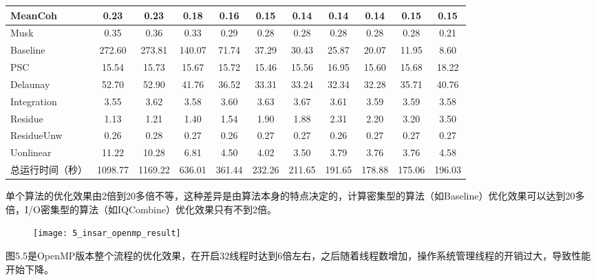 \begin{table}[!htbp]
\begin{tabular}{|l|c|c|c|c|c|c|c|c|c|c|}
		MeanCoh	            &   0.23	&   0.23	&   0.18	&   0.16	&   0.15	&   0.14	&   0.14	&   0.14	&   0.15	&   0.15      \\ \hline
		Musk	            &   0.35	&   0.36	&   0.33	&   0.29	&   0.28	&   0.28	&   0.28	&   0.28	&   0.28	&   0.21      \\ \hline
		Baseline	        &   272.60	&   273.81	&   140.07	&   71.74	&   37.29	&   30.43	&   25.87	&   20.07	&   11.95	&   8.60      \\ \hline
		PSC	                &   15.54	&   15.73	&   15.67	&   15.72	&   15.46	&   15.56	&   16.95	&   15.60	&   15.68	&   18.22      \\ \hline
		Delaunay	        &   52.70	&   52.90	&   41.76	&   36.52	&   33.31	&   33.24	&   32.34	&   32.28	&   35.71	&   40.76      \\ \hline
		Integration	        &   3.55	&   3.62	&   3.58	&   3.60	&   3.63	&   3.67	&   3.61	&   3.59	&   3.59	&   3.58      \\ \hline
		Residue	            &   1.13	&   1.21	&   1.40	&   1.54	&   1.90	&   1.88	&   2.31	&   2.20	&   3.20	&   3.50      \\ \hline
		ResidueUnw	        &   0.26	&   0.28	&   0.27	&   0.26	&   0.27	&   0.27	&   0.26	&   0.27	&   0.27	&   0.27      \\ \hline
		Uonlinear	        &   11.22	&   10.28	&   6.81	&   4.50	&   4.02	&   3.50	&   3.79	&   3.76	&   3.76	&   4.58      \\ \hline
        总运行时间（秒） 	&   1098.77	&   1169.22	&   636.01	&   361.44	&   232.26	&   211.65	&   191.65	&   178.88	&   175.06	&   196.03      \\ \hline
    \end{tabular}
\end{table}

单个算法的优化效果由2倍到20多倍不等，这种差异是由算法本身的特点决定的，计算密集型的算法（如Baseline）优化效果可以达到20多倍，I/O密集型的算法（如IQCombine）优化效果只有不到2倍。

\begin{figure}[!htbp]
    \centering
    \texttt{[image: 5\_insar\_openmp\_result]}
    \label{fig:5_insar_openmp_result}
\end{figure}

图5.5是OpenMP版本整个流程的优化效果，在开启32线程时达到6倍左右，之后随着线程数增加，操作系统管理线程的开销过大，导致性能开始下降。


